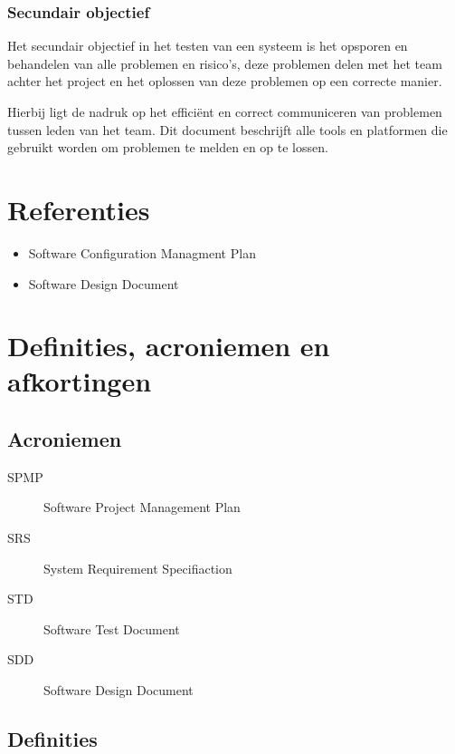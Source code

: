 \documentclass[a4paper]{article}
\begin{document}
\subsubsection{Secundair objectief}

Het secundair objectief in het testen van een systeem is het opsporen en behandelen van alle problemen en risico's, deze problemen delen met het team achter het project en het oplossen van deze problemen op een correcte manier.

Hierbij ligt de nadruk op het efficiënt en correct communiceren van problemen tussen leden van het team. Dit document beschrijft alle tools en platformen die gebruikt worden om problemen te melden en op te lossen.

\section{Referenties}

\begin{itemize}
\item Software Configuration Managment Plan
\item Software Design Document
\end{itemize}

\section{Definities, acroniemen en afkortingen}
\label{sec:definitions}

\subsection{Acroniemen}

\begin{description}

\item[SPMP] Software Project Management Plan
\item[SRS] System Requirement Specifiaction
\item[STD] Software Test Document
\item[SDD] Software Design Document

\end{description}

\subsection{Definities}
\end{document}
